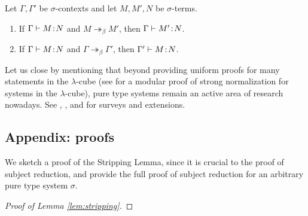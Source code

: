 \documentclass[reqno, twoside]{article}
\begin{document}
    \begin{theorem}\label{thm:subject_reduction}
        Let $\Gamma,\Gamma'$ be $\sigma$-contexts and let $M,M',N$ be $\sigma$-terms.
        \begin{enumerate}
            \item If $\Gamma\vdash M\!:\!N$ and $M\twoheadrightarrow_\beta M'$, then $\Gamma\vdash M'\!:\! N$.
                \vspace{-0.05in}
            \item If $\Gamma\vdash M\!:\!N$ and $\Gamma\twoheadrightarrow_\beta\Gamma'$, then $\Gamma'\vdash M\!:\! N$.
        \end{enumerate}
    \end{theorem}

    Let us close by mentioning that beyond providing uniform proofs for many statements in the $\lambda$-cube (see \cite{GN91} for a modular proof of strong normalization for systems in the $\lambda$-cube), pure type systems remain an active area of research nowadays. See \cite{Ter95}, \cite{BHS01}, and \cite{BG05} for surveys and extensions.

    \subsection*{Appendix: proofs}

    We sketch a proof of the Stripping Lemma, since it is crucial to the proof of subject reduction, and provide the full proof of subject reduction for an arbitrary pure type system $\sigma$.

    \begin{proof}[Proof of Lemma \ref{lem:stripping}]
        \TODO
    \end{proof}
\end{document}
